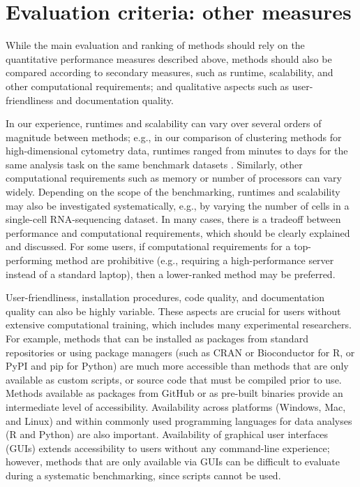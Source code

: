 \documentclass[12pt, a4paper]{article}
\begin{document}
\section*{Evaluation criteria: other measures}

While the main evaluation and ranking of methods should rely on the quantitative performance measures described above, methods should also be compared according to secondary measures, such as runtime, scalability, and other computational requirements; and qualitative aspects such as user-friendliness and documentation quality.

In our experience, runtimes and scalability can vary over several orders of magnitude between methods; e.g., in our comparison of clustering methods for high-dimensional cytometry data, runtimes ranged from minutes to days for the same analysis task on the same benchmark datasets \citep{Weber2016}. Similarly, other computational requirements such as memory or number of processors can vary widely. Depending on the scope of the benchmarking, runtimes and scalability may also be investigated systematically, e.g., by varying the number of cells in a single-cell RNA-sequencing dataset. In many cases, there is a tradeoff between performance and computational requirements, which should be clearly explained and discussed. For some users, if computational requirements for a top-performing method are prohibitive (e.g., requiring a high-performance server instead of a standard laptop), then a lower-ranked method may be preferred.

User-friendliness, installation procedures, code quality, and documentation quality can also be highly variable. These aspects are crucial for users without extensive computational training, which includes many experimental researchers. For example, methods that can be installed as packages from standard repositories or using package managers (such as CRAN or Bioconductor for R, or PyPI and pip for Python) are much more accessible than methods that are only available as custom scripts, or source code that must be compiled prior to use. Methods available as packages from GitHub or as pre-built binaries provide an intermediate level of accessibility. Availability across platforms (Windows, Mac, and Linux) and within commonly used programming languages for data analyses (R and Python) are also important. Availability of graphical user interfaces (GUIs) extends accessibility to users without any command-line experience; however, methods that are only available via GUIs can be difficult to evaluate during a systematic benchmarking, since scripts cannot be used.
\end{document}
